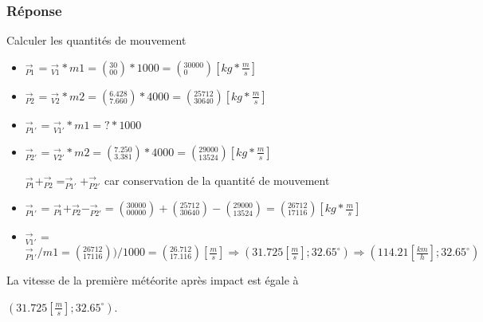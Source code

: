 \subsubsection{Réponse}
Calculer les quantités de mouvement
\begin{itemize}
    \item $_{P1}^{\rightarrow}$ = $_{V1}^{\rightarrow} * m1 = (^{30}_{00}) * 1000 = ({^{30000}_{0}})[kg*\frac{m}{s}]$
    \item $_{P2}^{\rightarrow}$ =  $_{V2}^{\rightarrow} * m2 = (^{6.428}_{7.660}) * 4000 = ({^{25712}_{30640}})[kg*\frac{m}{s}]$
    
    \item $_{P1'}^{\rightarrow}$ = $_{V1'}^{\rightarrow} * m1 = ? * 1000$  
    \item $_{P2'}^{\rightarrow}$ =  $_{V2'}^{\rightarrow} * m2 = (^{7.250}_{3.381}) * 4000 = ({^{29000}_{13524}})[kg*\frac{m}{s}]$
    \item[$_{P1}^{\rightarrow} + _{P2}^{\rightarrow} = _{P1'}^{\rightarrow} + _{P2'}^{\rightarrow}$] car conservation de la quantité de mouvement
    \item $_{P1'}^{\rightarrow}$ = $_{P1}^{\rightarrow}+_{P2}^{\rightarrow} - _{P2'}^{\rightarrow} =({^{30000}_{00000}})+ ({^{25712}_{30640}}) - ({^{29000}_{13524}}) = ({^{26712}_{17116}}) [kg*\frac{m}{s}]$
    \item $_{V1'}^{\rightarrow}$ = $_{P1'}^{\rightarrow} / m1 = ({^{26712}_{17116}})) / 1000 = ({^{26.712}_{17.116}})[\frac{m}{s}] \Rightarrow (31.725[\frac{m}{s}];32.65^\circ) \Rightarrow (114.21[\frac{km}{h}];32.65^\circ)$
\end{itemize}
   
La vitesse de la première météorite après impact est égale à 

$(31.725[\frac{m}{s}];32.65^\circ)$.
